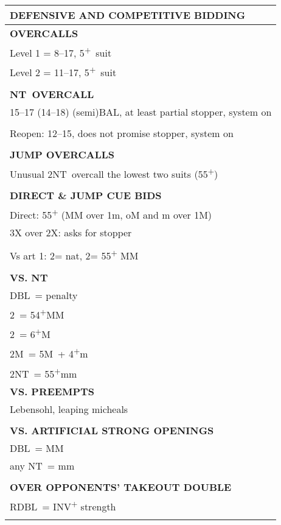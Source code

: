 \documentclass{article}
\newcommand{\C}{\texorpdfstring{\textcolor{ForestGreen}{\raisebox{-0.017em}{\ensuremath{\varclub}}}}{C}}
\newcommand{\D}{\texorpdfstring{\textcolor{YellowOrange}{\raisebox{-0.35pt}{\ensuremath{\vardiamond}}}}{D}}
\renewcommand{\H}{\texorpdfstring{\textcolor{Red}{\raisebox{-0.06em}{\ensuremath{\varheart}}}}{H}}
\newcommand\N{{\footnotesize NT}}
\newcommand{\+}{\textsuperscript{+}}
\newcommand{\X}{{\footnotesize{DBL}}}
\newcommand{\XX}{{\footnotesize{RDBL}}}
\newcommand{\m}{m}
\newcommand{\M}{M}
\begin{document}
\newpage
\noindent
\small
  \begin{adjustbox}{valign=t,minipage={90mm}}
    \begin{tabular}{|p{88mm}|}
      \hline
      \cellcolor[gray]{0.9} \textbf{DEFENSIVE AND COMPETITIVE BIDDING} \\ \hline
      \textbf{OVERCALLS} \\ \hline
      Level 1 = 8--17, 5\+\ suit\\
      Level 2 = 11--17, 5\+\ suit\\
      \\
      \hline
      \textbf{\N \ OVERCALL} \\ \hline
      15--17 (14--18) (semi)BAL, at least partial stopper, system on\\
      \\
      Reopen: 12--15, does not promise stopper, system on\\
      \\
      \hline
      \textbf{JUMP OVERCALLS} \\ \hline
      Unusual 2\N\ overcall the lowest two suits (55\+)\\
      \\
      \hline
      \textbf{DIRECT \& JUMP CUE BIDS} \\ \hline
      Direct: 55\+ (MM over 1m, oM and m over 1M)\\
      3X over 2X: asks for stopper\\
      \\
      Vs art 1\D: 2\D = nat, 2\H = 55\+ MM\\
      \\
      \hline
      \textbf{VS. NT} \\ \hline
      \X\ = penalty \\
      2\C\ = 54\+MM \\
      2\D\ = 6\+\M \\
      2\M\ = 5\M\ + 4\+\m\\
      2\N\ = 55\+mm \\
      \hline
      \textbf{VS. PREEMPTS} \\ \hline
      Lebensohl, leaping micheals\\
      \\
      \hline
      \textbf{VS. ARTIFICIAL STRONG OPENINGS} \\ \hline
      \X\ = MM \\
      any \N\ = mm\\
      \\
      \hline
      \textbf{OVER OPPONENTS' TAKEOUT DOUBLE} \\ \hline
      \XX\ = INV\+ strength\\
      \\
      \hline
    \end{tabular}
  \end{adjustbox}
\end{document}
